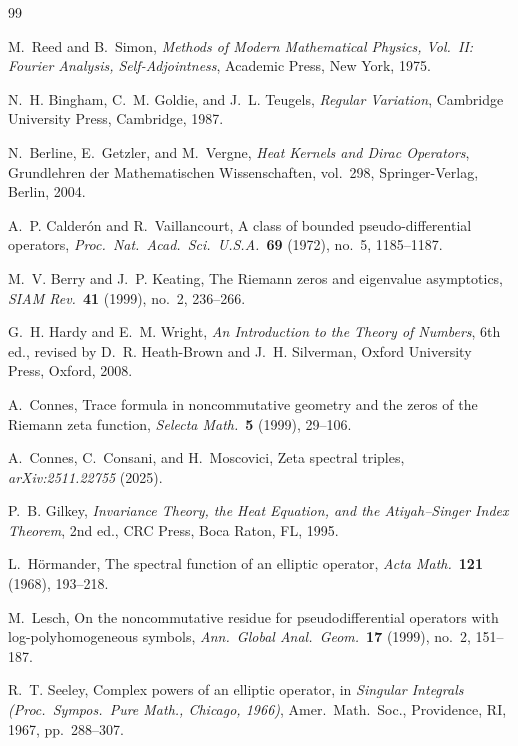 \documentclass[12pt]{amsart}
\begin{document}
{\sloppy
\begin{thebibliography}{99}

M.~Reed and B.~Simon,
\emph{Methods of Modern Mathematical Physics, Vol.~II: Fourier Analysis,
  Self-Adjointness},
Academic Press, New York, 1975.

N.~H. Bingham, C.~M. Goldie, and J.~L. Teugels,
\emph{Regular Variation},
Cambridge University Press, Cambridge, 1987.

N.~Berline, E.~Getzler, and M.~Vergne,
\emph{Heat Kernels and Dirac Operators},
Grundlehren der Mathematischen Wissenschaften, vol.~298,
Springer-Verlag, Berlin, 2004.

A.~P. Calder\'on and R.~Vaillancourt,
A class of bounded pseudo-differential operators,
\emph{Proc.\ Nat.\ Acad.\ Sci.\ U.S.A.}\ \textbf{69} (1972), no.~5, 1185--1187.

M.~V. Berry and J.~P. Keating,
The Riemann zeros and eigenvalue asymptotics,
\emph{SIAM Rev.}\ \textbf{41} (1999), no.~2, 236--266.

G.~H. Hardy and E.~M. Wright,
\emph{An Introduction to the Theory of Numbers},
6th ed., revised by D.~R. Heath-Brown and J.~H. Silverman,
Oxford University Press, Oxford, 2008.

A.~Connes,
Trace formula in noncommutative geometry and the zeros of the Riemann
zeta function,
\emph{Selecta Math.}\ \textbf{5} (1999), 29--106.

A.~Connes, C.~Consani, and H.~Moscovici,
Zeta spectral triples,
\emph{arXiv:2511.22755} (2025).

P.~B. Gilkey,
\emph{Invariance Theory, the Heat Equation, and the
Atiyah--Singer Index Theorem},
2nd ed., CRC Press, Boca Raton, FL, 1995.

L.~H\"ormander,
The spectral function of an elliptic operator,
\emph{Acta Math.}\ \textbf{121} (1968), 193--218.

M.~Lesch,
On the noncommutative residue for pseudodifferential operators with
log-polyhomogeneous symbols,
\emph{Ann.\ Global Anal.\ Geom.}\ \textbf{17} (1999), no.~2, 151--187.

R.~T. Seeley,
Complex powers of an elliptic operator,
in \emph{Singular Integrals (Proc.\ Sympos.\ Pure Math., Chicago,
1966)}, Amer.\ Math.\ Soc., Providence, RI, 1967, pp.~288--307.


\end{thebibliography}}
\end{document}
